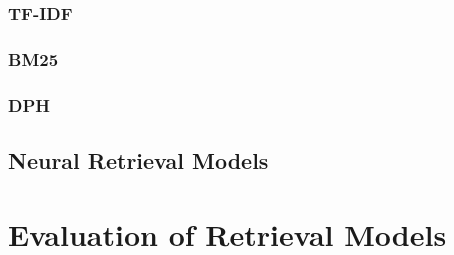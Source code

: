 \subsubsection{TF-IDF}\label{tf-idf}
\subsubsection{BM25}\label{bm25}
\subsubsection{DPH}\label{dph}

\subsection{Neural Retrieval Models}\label{neural-retrieval-models}

\section{Evaluation of Retrieval Models}\label{evaluation-of-retrieval-models}